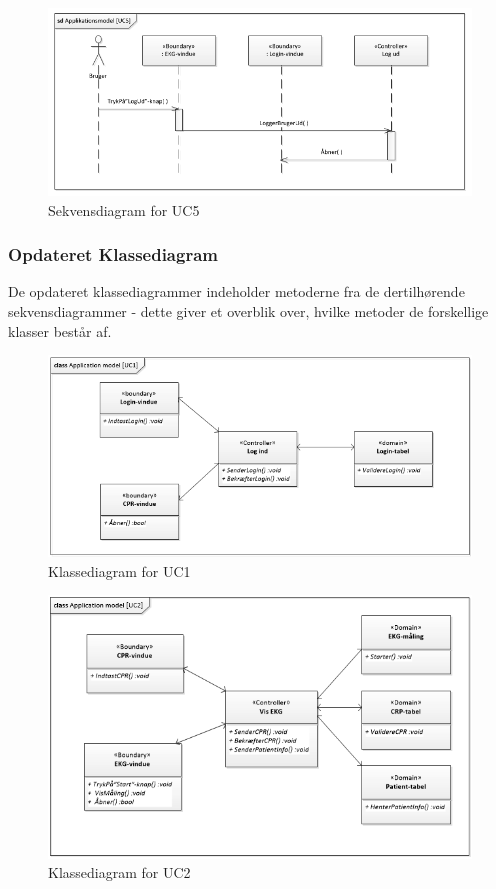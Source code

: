 \begin{figure}[H]
	\centering
	\includegraphics[width=1\textwidth]{Figurer/Snip20150429_30}
	\caption{Sekvensdiagram for UC5}
\end{figure}

\subsubsection{Opdateret Klassediagram}
De opdateret klassediagrammer indeholder metoderne fra de dertilhørende  sekvensdiagrammer - dette giver et overblik over, hvilke metoder de forskellige klasser består af.

\begin{figure}[H]
	\centering
	\includegraphics[width=1\textwidth]{Figurer/Snip20150429_20}
	\caption{Klassediagram for UC1}
\end{figure}  

\begin{figure}[H]
	\centering
	\includegraphics[width=1\textwidth]{Figurer/Snip20150429_22}
	\caption{Klassediagram for UC2}
\end{figure}

